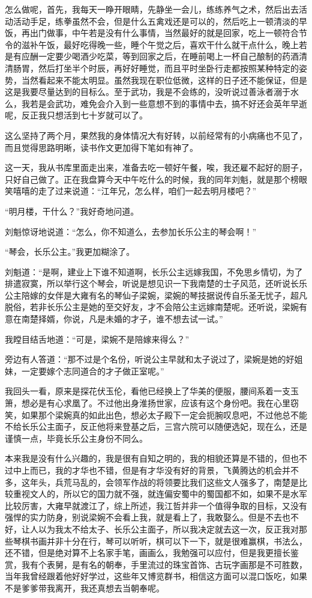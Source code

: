 怎么做呢，首先，我每天一睁开眼睛，先静坐一会儿，练练养气之术，然后出去活动活动手足，练拳虽然不会，但是什么五禽戏还是可以的，然后吃上一顿清淡的早饭，再出门做事，中午若是没有什么事情，当然最好的就是回家，吃上一顿符合节令的滋补午饭，最好吃得晚一些，睡个午觉之后，喜欢干什么就干点什么，晚上若是有应酬一定要少喝酒少吃菜，等到回家之后，在睡前喝上一杯自己酿制的药酒清清肠胃，然后打坐半个时辰，再好好睡觉，而且平时坐卧行走都按照某种特定的姿势，当然看起来不能太明显。虽然我现在职位低微，这样的日子还不能保证，但是这是我要尽量达到的目标么。至于武功，我是不会练的，没听说过善泳者溺于水么，我若是会武功，难免会介入到一些意想不到的事情中去，搞不好还会英年早逝呢，反正我只想活到七十岁就可以了。

这么坚持了两个月，果然我的身体情况大有好转，以前经常有的小病痛也不见了，而且觉得思路明晰，读书作文更加得下笔如有神了。

这一天，我从书库里面走出来，准备去吃一顿好午餐，唉，我还雇不起好的厨子，只好自己做了。正在我盘算今天中午吃什么的时候，我的同年刘魁，就是那个榜眼笑嘻嘻的走了过来说道：“江年兄，怎么样，咱们一起去明月楼吧？”

“明月楼，干什么？”我好奇地问道。

刘魁惊讶地说道：“怎么，你不知道么，去参加长乐公主的琴会啊！”

“琴会，长乐公主。”我更加糊涂了。

刘魁道：“是啊，建业上下谁不知道啊，长乐公主远嫁我国，不免思乡情切，为了排遣寂寞，所以举行这个琴会，听说是想见识一下我南楚的士子风范，还听说长乐公主陪嫁的女伴是大雍有名的琴仙子梁婉，梁婉的琴技据说传自乐圣无忧子，超凡脱俗，若非长乐公主是她的至交好友，才不会陪公主远嫁南楚呢。还听说，梁婉有意在南楚择婿，你说，凡是未婚的才子，谁不想去试一试。”

我瞠目结舌地道：“可是，梁婉不是陪嫁来得么？”

旁边有人答道：“那不过是个名份，听说公主早就和太子说过了，梁婉是她的好姐妹，一定要嫁个志同道合的才子做正室呢。”

我回头一看，原来是探花伏玉伦，看他已经换上了华美的便服，腰间系着一支玉箫，想必是有心求凰了。不过他出身淮扬世家，应该有这个身份吧。我在心里窃笑，如果那个梁婉真的如此出色，想必太子殿下一定会扼腕叹息吧，不过他总不能不给长乐公主面子，反正他将来登基之后，三宫六院可以随便选妃，现在么，还是谨慎一点，毕竟长乐公主身份不同么。

本来我是没有什么兴趣的，我是很有自知之明的，我的相貌还算是不错的，但也不过中上而已，我的才华也不错，但是有才华没有好的背景，飞黄腾达的机会并不多，这年头，兵荒马乱的，会领军作战的将领要比我们这些文人强多了，南楚是比较重视文人的，所以它的国力就不强，就连偏安蜀中的蜀国都不如，如果不是水军比较厉害，大雍早就渡江了，综上所述，我江哲并非一个值得争取的目标，又没有强悍的实力防身，别说梁婉不会看上我，就是看上了，我敢娶么。但是不去也不好，让人以为我太不给太子、长乐公主面子，所以我决定就去这一次，反正我对那些琴棋书画并非十分在行，琴可以听听，棋可以下一下，就是很难赢棋，书法么，还不错，但是绝对算不上名家手笔，画画么，我勉强可以应付，但是我更擅长鉴赏，我有个表舅，是有名的朝奉，手里流过的珠宝首饰、古玩字画那是不可胜数，当年我曾经跟着他好好学过，这些年又博览群书，相信这方面可以混口饭吃，如果不是爹爹带我离开，我还真想去当朝奉呢。

